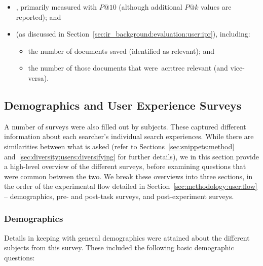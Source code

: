 \begin{itemize}
    \item{, primarily measured with $P@10$ (although additional $P@k$ values are reported); and}
    \item{ (as discussed in Section~\ref{sec:ir_background:evaluation:user:ipr}), including:}
    
    \begin{itemize}
        \item{the number of documents saved (identified as relevant); and}
        \item{the number of those documents that were~\gls{acr:trec} relevant (and vice-versa).}
    \end{itemize}
\end{itemize}


\subsection{Demographics and User Experience Surveys}\label{sec:methodology:extracting:user}
A number of surveys were also filled out by subjects. These captured different information about each searcher's individual search experiences. While there are similarities between what is asked (refer to Sections~\ref{sec:snippets:method} and~\ref{sec:diversity:users:diversifying} for further details), we in this section provide a high-level overview of the different surveys, before examining questions that were common between the two. We break these overviews into three sections, in the order of the experimental flow detailed in Section~\ref{sec:methodology:user:flow} -- demographics, pre- and post-task surveys, and post-experiment surveys.

\subsubsection{Demographics}
Details in keeping with general demographics were attained about the different subjects from this survey. These included the following basic demographic questions:

